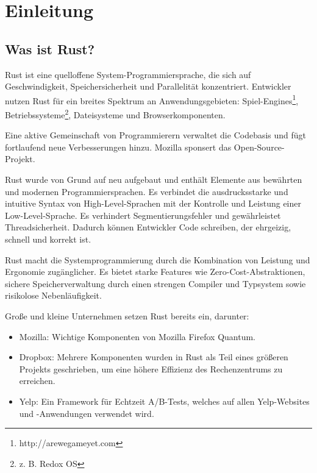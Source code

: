 \chapter{Einleitung}


\section{Was ist Rust?}

Rust ist eine quelloffene System-Programmiersprache, die sich auf Geschwindigkeit, Speichersicherheit und Parallelität konzentriert. Entwickler nutzen Rust für ein breites Spektrum an Anwendungsgebieten: Spiel-Engines\footnote{http://arewegameyet.com}, Betriebssysteme\footnote{z. B. Redox OS}, Dateisysteme und Browserkomponenten. \cite{Rust}

Eine aktive Gemeinschaft von Programmierern verwaltet die Codebasis und fügt fortlaufend neue Verbesserungen hinzu. Mozilla sponsert das Open-Source-Projekt.

Rust wurde von Grund auf neu aufgebaut und enthält Elemente aus bewährten und modernen Programmiersprachen. Es verbindet die ausdrucksstarke und intuitive Syntax von High-Level-Sprachen mit der Kontrolle und Leistung einer Low-Level-Sprache. Es verhindert Segmentierungsfehler und gewährleistet Threadsicherheit. Dadurch können Entwickler Code schreiben, der ehrgeizig, schnell und korrekt ist.

Rust macht die Systemprogrammierung durch die Kombination von Leistung und Ergonomie zugänglicher. Es bietet starke Features wie Zero-Cost-Abstraktionen, sichere Speicherverwaltung durch einen strengen Compiler und Typsystem sowie risikolose Nebenläufigkeit.

Große und kleine Unternehmen setzen Rust bereits ein, darunter:
\begin{itemize}
    \item Mozilla: Wichtige Komponenten von Mozilla Firefox Quantum.
    \item Dropbox: Mehrere Komponenten wurden in Rust als Teil eines größeren Projekts geschrieben, um eine höhere Effizienz des Rechenzentrums zu erreichen.
    \item Yelp: Ein Framework für Echtzeit A/B-Tests, welches auf allen Yelp-Websites und -Anwendungen verwendet wird.
\end{itemize}
